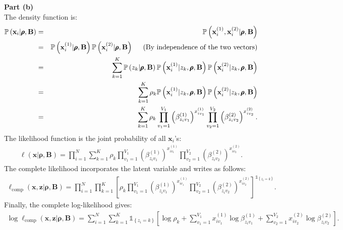 \documentclass[a4paper, 11pt]{article}
\begin{document}
\textbf{Part (b)}\\
\newline The density function is:
\begin{eqnarray}
\mathbb{P}\left( \mathbf{x}_i | \pmb{\rho}, \mathbf{B} \right) &=& \mathbb{P}\left( \mathbf{x}_i^{(1)}, \mathbf{x}_i^{(2)} | \pmb{\rho}, \mathbf{B} \right) \nonumber \\
&=& \mathbb{P}\left(\mathbf{x}_i^{(1)} | \pmb{\rho}, \mathbf{B}\right)\mathbb{P}\left(\mathbf{x}_i^{(2)} | \pmb{\rho}, \mathbf{B}\right)\hspace{0.5cm} \text{(By independence of the two vectors)} \nonumber \\
&=& \sum_{k=1}^{K} \mathbb{P}\left(z_k | \pmb{\rho}, \mathbf{B}\right)\mathbb{P}\left(\mathbf{x}_i^{(1)} | z_k, \pmb{\rho}, \mathbf{B}\right)\mathbb{P}\left(\mathbf{x}_i^{(2)} | z_k, \pmb{\rho}, \mathbf{B}\right)\nonumber \\
&=& \sum_{k=1}^{K} \rho_k \mathbb{P}\left(\mathbf{x}_i^{(1)} | z_k, \pmb{\rho}, \mathbf{B}\right)\mathbb{P}\left(\mathbf{x}_i^{(2)} | z_k, \pmb{\rho}, \mathbf{B}\right)\nonumber \\
&=& \sum_{k=1}^{K} \rho_k \prod_{v_1=1}^{V_1} \left( \beta_{z_i v_1}^{(1)} \right)^{x_{i v_1}^{(1)}} \prod_{v_2=1}^{V_2} \left( \beta_{z_i v_2}^{(2)} \right)^{x_{i v_2}^{(2)}}. \nonumber
\end{eqnarray}
The likelihood function is the joint probability of all $\mathbf{x}_i$'s:
\begin{eqnarray}
\ell (\mathbf{x} | \pmb{\rho}, \mathbf{B}) = \prod_{i=1}^N \sum_{k=1}^{K} \rho_k \prod_{v_1=1}^{V_1} \left( \beta_{z_i v_1}^{(1)} \right)^{x_{i v_1}^{(1)}} \prod_{v_2=1}^{V_2} \left( \beta_{z_i v_2}^{(2)} \right)^{x_{i v_2}^{(2)}}. \nonumber
\end{eqnarray}
The complete likelihood incorporates the latent variable and writes as follows:
\begin{eqnarray}
\ell_{\text{comp}} (\mathbf{x}, \mathbf{z} | \pmb{\rho}, \mathbf{B}) = \prod_{i=1}^N \prod_{k=1}^{K} \left[ \rho_k \prod_{v_1=1}^{V_1} \left( \beta_{z_i v_1}^{(1)} \right)^{x_{i v_1}^{(1)}} \prod_{v_2=1}^{V_2} \left( \beta_{z_i v_2}^{(2)} \right)^{x_{i v_2}^{(2)}} \right]^{\mathbb{1}_{ \left\{ z_i = k \right\} }}. \nonumber
\end{eqnarray}
Finally, the complete log-likelihood gives:
\begin{eqnarray}
\log \ell_{\text{comp}} (\mathbf{x}, \mathbf{z} | \pmb{\rho}, \mathbf{B}) = \sum_{i=1}^N \sum_{k=1}^{K} \mathbb{1}_{ \left\{ z_i = k \right\} } \left[ \log \rho_k + \sum_{v_1=1}^{V_1} x_{i v_1}^{(1)} \log \beta_{z_i v_1}^{(1)} + \sum_{v_2=1}^{V_2} x_{i v_2}^{(2)} \log \beta_{z_i v_2}^{(2)} \right]. \nonumber
\end{eqnarray}
\end{document}
